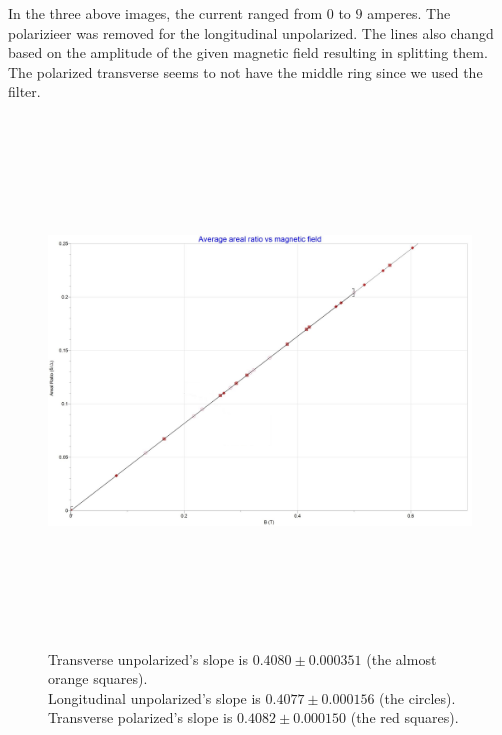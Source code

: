 \documentclass[fleqn]{article}
\begin{document}
  \pagebreak

  In the three above images, the current ranged from $0$ to $9$ amperes. The polarizieer was removed for the longitudinal 
  unpolarized. The lines also changd based on the amplitude of the given magnetic field resulting in splitting them. The 
  polarized transverse seems to not have the middle ring since we used the filter.

  \pagebreak


  \begin{figure}[h!]
    \includegraphics[height=14cm, width=16cm]{Figure2.JPG}
    \caption{
      Transverse unpolarized's slope is $0.4080 \pm 0.000351$ (the almost orange squares).
      \\
      Longitudinal unpolarized's slope is $0.4077 \pm 0.000156$ (the circles).
      \\
      Transverse polarized's slope is $0.4082 \pm 0.000150$ (the red squares).
    }
  \end{figure}

  \pagebreak
\end{document}
